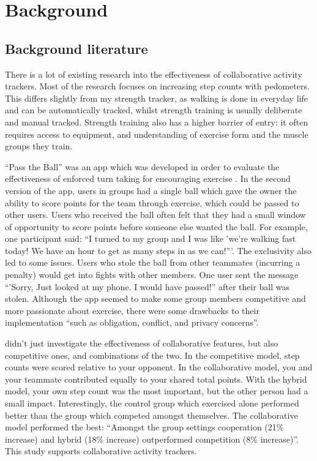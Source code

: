 \documentclass{l4proj}
\begin{document}


\chapter{Background}

\section{Background literature}
There is a lot of existing research into the effectiveness of collaborative activity trackers. Most of the research focuses on increasing step counts with pedometers. This differs slightly from my strength tracker, as walking is done in everyday life and can be automatically tracked, whilst strength training is usually deliberate and manual tracked. Strength training also has a higher barrier of entry: it often requires access to equipment, and understanding of exercise form and the muscle groups they train.

``Pass the Ball'' was an app which was developed in order to evaluate the effectiveness of enforced turn taking for encouraging exercise \citep{Pass_the_ball}. In the second version of the app, users in groups had a single ball which gave the owner the ability to score points for the team through exercise, which could be passed to other users. Users who received the ball often felt that they had a small window of opportunity to score points before someone else wanted the ball. For example, one participant said: ``I turned to my group and I was like 'we’re walking fast today! We have an hour to get as many steps in as we can!'''. The exclusivity also led to some issues. Users who stole the ball from other teammates (incurring a penalty) would get into fights with other members. One user sent the message ``'Sorry, Just looked at my phone. I would have passed!'' after their ball was stolen. Although the app seemed to make some group members competitive and more passionate about exercise, there were some drawbacks to their implementation ``such as obligation, conflict, and privacy concerns''.

\citet{HealthyTogether} didn't just investigate the effectiveness of collaborative features, but also competitive ones, and combinations of the two. In the competitive model, step counts were scored relative to your opponent. In the collaborative model, you and your teammate contributed equally to your shared total points.  With the hybrid model, your own step count was the most important, but the other person had a small impact. Interestingly, the control group which exercised alone performed better than the group which competed amongst themselves. The collaborative model performed the best: ``Amongst the group settings cooperation (21\% increase) and hybrid (18\% increase) outperformed competition (8\% increase)''. This study supports collaborative activity trackers.
\end{document}
